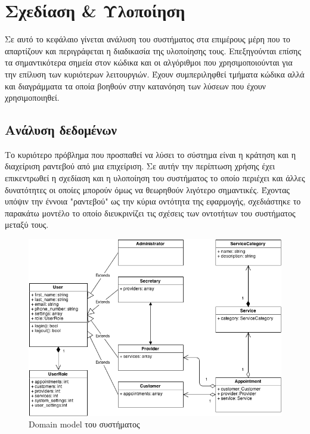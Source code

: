 
\chapter{Σχεδίαση \& Υλοποίηση}
Σε αυτό το κεφάλαιο γίνεται ανάλυση του συστήματος στα επιμέρους μέρη που το απαρτίζουν και περιγράφεται η διαδικασία της υλοποίησης τους. Επεξηγούνται επίσης τα σημαντικότερα σημεία στον κώδικα και οι αλγόριθμοι που χρησιμοποιούνται για την επίλυση των κυριότερων λειτουργιών. Έχουν συμπεριληφθεί τμήματα κώδικα αλλά και διαγράμματα τα οποία βοηθούν στην κατανόηση των λύσεων που έχουν χρησιμοποιηθεί.

\section{Ανάλυση δεδομένων}
Το κυριότερο πρόβλημα που προσπαθεί να λύσει το σύστημα είναι η κράτηση και η διαχείριση ραντεβού από μια επιχείριση. Σε αυτήν την περίπτωση χρήσης έχει επικεντρωθεί η σχεδίαση και η υλοποίηση του συστήματος το οποίο περιέχει και άλλες δυνατότητες οι οποίες μπορούν όμως να θεωρηθούν λιγότερο σημαντικές. Έχοντας υπόψιν την έννοια "ραντεβού" ως την κύρια οντότητα της εφαρμογής, σχεδιάστηκε το παρακάτω μοντέλο το οποίο διευκρινίζει τις σχέσεις των οντοτήτων του συστήματος μεταξύ τους.

\begin{figure}[ht!]
\centering
\includegraphics[width=160mm]{images/domain-model.png}
\caption{Domain model του συστήματος}
\label{domain-model}
\end{figure}

